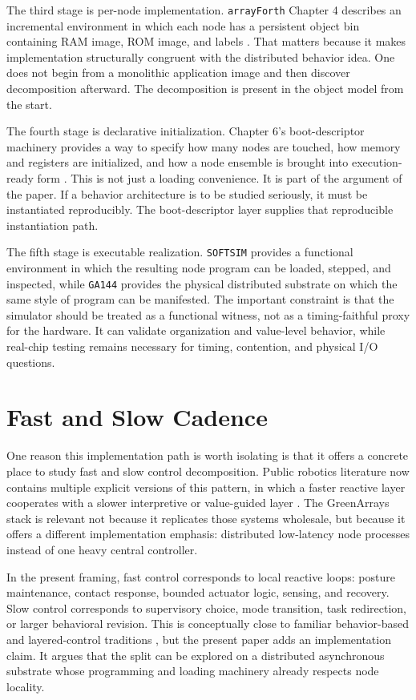 \documentclass[11pt]{article}
\begin{document}
The third stage is per-node implementation. \texttt{arrayForth} Chapter 4
describes an incremental environment in which each node has a persistent
object bin containing RAM image, ROM image, and labels
\citep{greenarrays2011db013}. That matters because it makes implementation
structurally congruent with the distributed behavior idea. One does not
begin from a monolithic application image and then discover decomposition
afterward. The decomposition is present in the object model from the start.

The fourth stage is declarative initialization. Chapter 6's boot-descriptor
machinery provides a way to specify how many nodes are touched, how memory
and registers are initialized, and how a node ensemble is brought into
execution-ready form \citep{greenarrays2011db013}. This is not just a
loading convenience. It is part of the argument of the paper. If a behavior
architecture is to be studied seriously, it must be instantiated
reproducibly. The boot-descriptor layer supplies that reproducible
instantiation path.

The fifth stage is executable realization. \texttt{SOFTSIM} provides a
functional environment in which the resulting node program can be loaded,
stepped, and inspected, while \texttt{GA144} provides the physical
distributed substrate on which the same style of program can be manifested.
The important constraint is that the simulator should be treated as a
functional witness, not as a timing-faithful proxy for the hardware. It can
validate organization and value-level behavior, while real-chip testing
remains necessary for timing, contention, and physical I/O questions.

\section{Fast and Slow Cadence}

One reason this implementation path is worth isolating is that it offers a
concrete place to study fast and slow control decomposition. Public robotics
literature now contains multiple explicit versions of this pattern, in which
a faster reactive layer cooperates with a slower interpretive or
value-guided layer \citep{wang2025hume}. The GreenArrays stack is relevant
not because it replicates those systems wholesale, but because it offers a
different implementation emphasis: distributed low-latency node processes
instead of one heavy central controller.

In the present framing, fast control corresponds to local reactive loops:
posture maintenance, contact response, bounded actuator logic, sensing, and
recovery. Slow control corresponds to supervisory choice, mode transition,
task redirection, or larger behavioral revision. This is conceptually close
to familiar behavior-based and layered-control traditions
\citep{arkin1998behavior,brooks1991intelligence}, but the present paper adds
an implementation claim. It argues that the split can be explored on a
distributed asynchronous substrate whose programming and loading machinery
already respects node locality.
\end{document}
